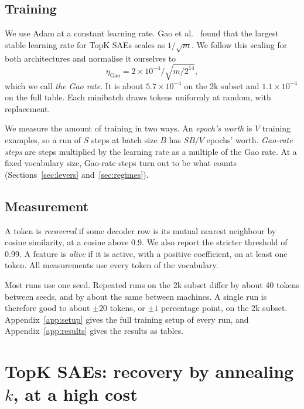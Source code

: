 \documentclass[11pt]{article}
\begin{document}
\subsection{Training}

We use Adam \cite{kingma2015adam} at a constant learning rate. Gao et al.~\cite{gao2024scaling} found that the largest stable learning rate for TopK SAEs scales as $1/\sqrt{m}$. We follow this scaling for both architectures and normalise it ourselves to
\begin{equation}
\eta_{\mathrm{Gao}} = 2 \times 10^{-4} \Big/ \sqrt{m / 2^{14}} ,
\end{equation}
which we call \emph{the Gao rate}. It is about $5.7\times10^{-4}$ on the 2k subset and $1.1\times10^{-4}$ on the full table. Each minibatch draws tokens uniformly at random, with replacement.

We measure the amount of training in two ways. An \emph{epoch's worth} is $V$ training examples, so a run of $S$ steps at batch size $B$ has $SB/V$ epochs' worth. \emph{Gao-rate steps} are steps multiplied by the learning rate as a multiple of the Gao rate. At a fixed vocabulary size, Gao-rate steps turn out to be what counts (Sections~\ref{sec:levers} and~\ref{sec:regimes}).

\subsection{Measurement}

A token is \emph{recovered} if some decoder row is its mutual nearest neighbour by cosine similarity, at a cosine above 0.9. We also report the stricter threshold of 0.99. A feature is \emph{alive} if it is active, with a positive coefficient, on at least one token. All measurements use every token of the vocabulary.

Most runs use one seed. Repeated runs on the 2k subset differ by about 40 tokens between seeds, and by about the same between machines. A single run is therefore good to about $\pm20$ tokens, or $\pm1$ percentage point, on the 2k subset. Appendix~\ref{app:setup} gives the full training setup of every run, and Appendix~\ref{app:results} gives the results as tables.

\section{TopK SAEs: recovery by annealing \texorpdfstring{$k$}{k}, at a high cost}
\label{sec:topk}
\end{document}

